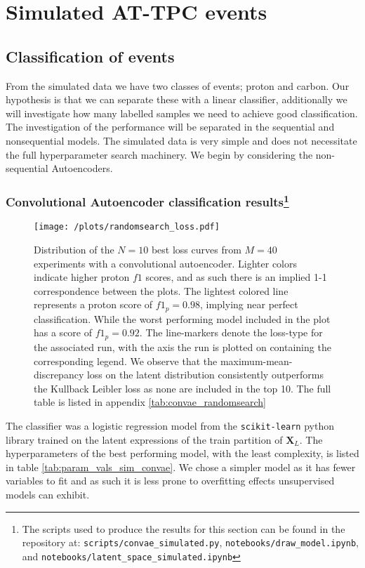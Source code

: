 \section{Simulated AT-TPC events}


\subsection{Classification of events} 
From the simulated data we have two classes of events; proton and carbon. Our hypothesis is that we can separate these with a linear classifier, additionally we will investigate how many labelled samples we need to achieve good classification. The investigation of the performance will be separated in the sequential and non\-sequential models. The simulated data is very simple and does not necessitate the full hyperparameter search machinery. We begin by considering the non-sequential Autoencoders.

\subsubsection{Convolutional Autoencoder classification results\protect\footnote{The scripts used to produce the results for this section can be found in the repository at: \lstinline{scripts/convae_simulated.py}, \lstinline{notebooks/draw_model.ipynb}, and \lstinline{notebooks/latent_space_simulated.ipynb}}}

\begin{figure}[H]
\centering
\texttt{[image: /plots/randomsearch\_loss.pdf]}
\caption[Randomsearch loss curves for CONV-AE on simulated AT-TPC data]{Distribution of the $N=10$ best loss curves from $M=40$ experiments with a convolutional autoencoder. Lighter colors indicate higher proton $f1$ scores, and as such there is an implied 1-1 correspondence between the plots. The lightest colored line represents a proton score of $f1_p = 0.98$, implying near perfect classification. While the worst performing model included in the plot has a score of $f1_p = 0.92$. The line-markers denote the loss-type for the associated run, with the axis the run is plotted on containing the corresponding legend. We observe that the maximum-mean-discrepancy loss on the latent distribution consistently outperforms the Kullback Leibler loss as none are included in the top 10. The full table is listed in appendix \ref{tab:convae_randomsearch}}\label{fig:sim_clf_loss}
\end{figure}


The classifier was a logistic regression model from the \lstinline{scikit-learn} python library trained on the latent expressions of the train partition of $\boldsymbol{X}_L$. The hyperparameters of the best performing model, with the least complexity, is listed in table \ref{tab:param_vals_sim_convae}. We chose a simpler model as it has fewer variables to fit and as such it is less prone to overfitting effects unsupervised models can exhibit. 


